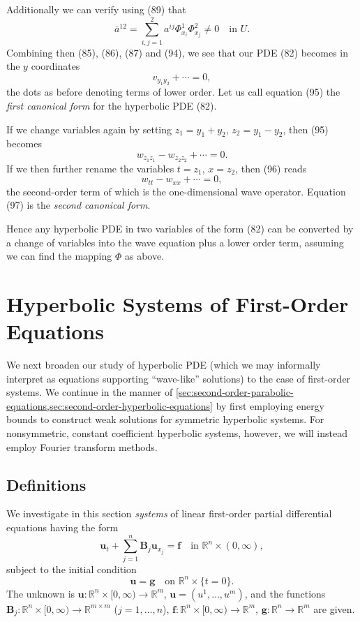 Additionally we can verify using (89) that
\[
\bar{a}^{12} = \sum_{i,j=1}^{2} a^{ij}\Phi^1_{x_i}\Phi^2_{x_j} \neq 0 \quad \text{in } U.
\tag{94}
\]
Combining then (85), (86), (87) and (94), we see that our PDE (82) becomes in the $y$ coordinates
\[
v_{y_1 y_2} + \cdots = 0,
\tag{95}
\]
the dots as before denoting terms of lower order. Let us call equation (95) the \textit{first canonical form} for the hyperbolic PDE (82).

If we change variables again by setting $z_1 = y_1 + y_2$, $z_2 = y_1 - y_2$, then (95) becomes
\[
w_{z_1 z_1} - w_{z_2 z_2} + \cdots = 0.
\tag{96}
\]
If we then further rename the variables $t = z_1$, $x = z_2$, then (96) reads
\[
w_{tt} - w_{xx} + \cdots = 0,
\tag{97}
\]
the second-order term of which is the one-dimensional wave operator. Equation (97) is the \textit{second canonical form}.

Hence any hyperbolic PDE in two variables of the form (82) can be converted by a change of variables into the wave equation plus a lower order term, assuming we can find the mapping $\Phi$ as above.

\section{Hyperbolic Systems of First-Order Equations}
\label{sec:hyperbolic-systems-first-order-equations}

We next broaden our study of hyperbolic PDE (which we may informally interpret as equations supporting ``wave-like'' solutions) to the case of first-order systems. We continue in the manner of \cref{sec:second-order-parabolic-equations,sec:second-order-hyperbolic-equations} by first employing energy bounds to construct weak solutions for symmetric hyperbolic systems. For nonsymmetric, constant coefficient hyperbolic systems, however, we will instead employ Fourier transform methods.

\subsection{Definitions}

We investigate in this section \textit{systems} of linear first-order partial differential equations having the form
\[
\mathbf{u}_t + \sum_{j=1}^{n} \mathbf{B}_j \mathbf{u}_{x_j} = \mathbf{f} \quad \text{in } \mathbb{R}^n \times (0,\infty),
\tag{1}
\]
subject to the initial condition
\[
\mathbf{u} = \mathbf{g} \quad \text{on } \mathbb{R}^n \times \{t = 0\}.
\tag{2}
\]
The unknown is $\mathbf{u} : \mathbb{R}^n \times [0, \infty) \to \mathbb{R}^m$, $\mathbf{u} = (u^1, \ldots, u^m)$, and the functions $\mathbf{B}_j : \mathbb{R}^n \times [0, \infty) \to \mathbb{R}^{m \times m}$ ($j = 1, \ldots, n$), $\mathbf{f} : \mathbb{R}^n \times [0, \infty) \to \mathbb{R}^m$, $\mathbf{g} : \mathbb{R}^n \to \mathbb{R}^m$ are given.

